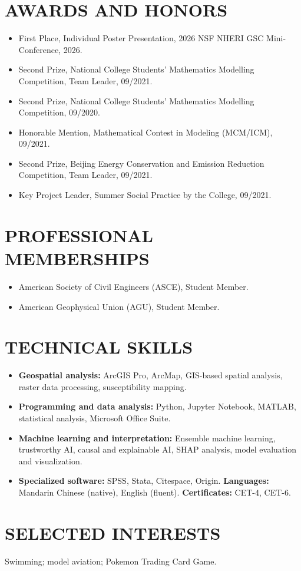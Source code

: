 \documentclass[10pt,letterpaper]{article}
\begin{document}
\section*{AWARDS AND HONORS}
\begin{itemize}
    \item First Place, Individual Poster Presentation, 2026 NSF NHERI GSC Mini-Conference, 2026.
    \item Second Prize, National College Students' Mathematics Modelling Competition, Team Leader, 09/2021.
    \item Second Prize, National College Students' Mathematics Modelling Competition, 09/2020.
    \item Honorable Mention, Mathematical Contest in Modeling (MCM/ICM), 09/2021.
    \item Second Prize, Beijing Energy Conservation and Emission Reduction Competition, Team Leader, 09/2021.
    \item Key Project Leader, Summer Social Practice by the College, 09/2021.
\end{itemize}

\section*{PROFESSIONAL MEMBERSHIPS}
\begin{itemize}
    \item American Society of Civil Engineers (ASCE), Student Member.
    \item American Geophysical Union (AGU), Student Member.
\end{itemize}

\section*{TECHNICAL SKILLS}
\begin{itemize}
    \item \textbf{Geospatial analysis:} ArcGIS Pro, ArcMap, GIS-based spatial analysis, raster data processing, susceptibility mapping.
    \item \textbf{Programming and data analysis:} Python, Jupyter Notebook, MATLAB, statistical analysis, Microsoft Office Suite.
    \item \textbf{Machine learning and interpretation:} Ensemble machine learning, trustworthy AI, causal and explainable AI, SHAP analysis, model evaluation and visualization.
    \item \textbf{Specialized software:} SPSS, Stata, Citespace, Origin. \textbf{Languages:} Mandarin Chinese (native), English (fluent). \textbf{Certificates:} CET-4, CET-6.
\end{itemize}

\section*{SELECTED INTERESTS}
Swimming; model aviation; Pokemon Trading Card Game.
\end{document}
